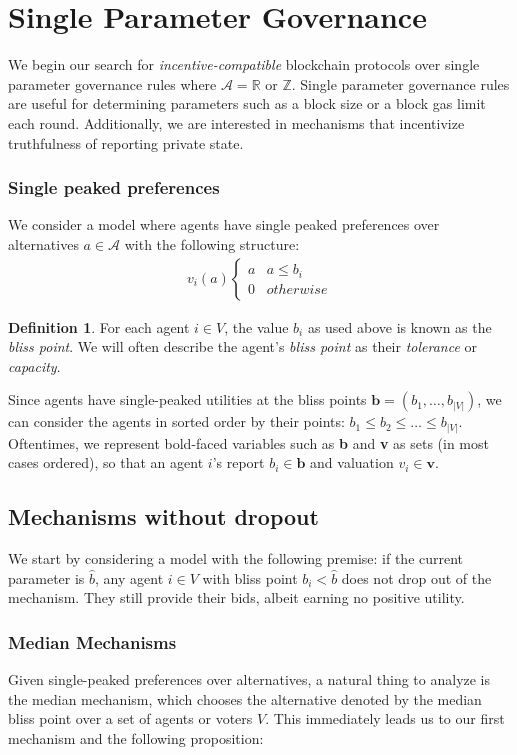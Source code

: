\documentclass{article}
\theoremstyle{definition}
\newtheorem{definition}{Definition}[section]
\theoremstyle{definition}
\newcounter{protocol}
\begin{document}
\section{Single Parameter Governance}
We begin our search for \textit{incentive-compatible} blockchain protocols over single parameter governance rules where $\mathcal{A}=\mathbb{R}$ or $\mathbb{Z}$. Single parameter governance rules are useful for determining parameters such as a block size or a block gas limit each round. Additionally, we are interested in mechanisms that incentivize truthfulness of reporting private state.

\subsubsection{Single peaked preferences}
We consider a model where agents have single peaked preferences over alternatives $a\in \mathcal{A}$ with the following structure:
\begin{align*}
v_i(a) \begin{cases} 
      a & a\leq b_i \\
      0 & otherwise
   \end{cases}
\end{align*}
\begin{definition}
For each agent $i\in V$, the value $b_i$ as used above is known as the \textit{bliss point}. We will often describe the agent's \textit{bliss point} as their \textit{tolerance} or \textit{capacity}.
\end{definition}

Since agents have single-peaked utilities at the bliss points $\textbf{b} = (b_1,\dots, b_{|V|})$, we can consider the agents in sorted order by their points: $b_1\leq b_2\leq \dots\leq b_{|V|}$. Oftentimes, we represent bold-faced variables such as \textbf{b} and \textbf{v} as sets (in most cases ordered), so that an agent $i$'s report $b_i\in \textbf{b}$ and valuation $v_i\in\textbf{v}$.

\subsection{Mechanisms without dropout}
We start by considering a model with the following premise: if the current parameter is $\hat{b}$, any agent $i\in V$ with bliss point $b_i< \hat{b}$ does not drop out of the mechanism. They still provide their bids, albeit earning no positive utility.
\subsubsection{Median Mechanisms}
Given single-peaked preferences over alternatives, a natural thing to analyze is the median mechanism, which chooses the alternative denoted by the median bliss point over a set of agents or voters $V$. This immediately leads us to our first mechanism and the following proposition:
\end{document}
